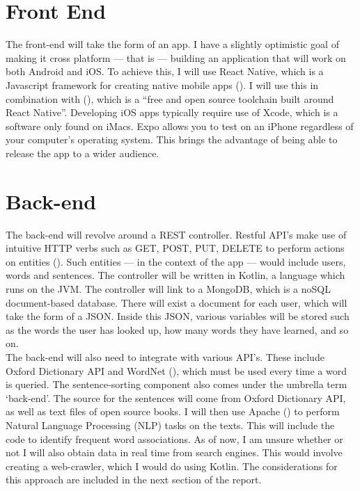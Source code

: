 \section{Front End}
The front-end will take the form of an app. I have a slightly optimistic goal of making it cross platform --- that is --- building an application that will work on both Android and iOS. To achieve this, I will use React Native, which is a Javascript framework for creating native mobile apps (\cite{reactNative}). I will use this in combination with (\cite{Expo}), which is a ``free and open source toolchain built around React Native''. Developing iOS apps typically require use of Xcode, which is a software only found on iMacs. Expo allows you to test on an iPhone regardless of your computer's operating system. This brings the advantage of being able to release the app to a wider audience.

\section{Back-end}

The back-end will revolve around a REST controller. Restful API's make use of intuitive HTTP verbs such as GET, POST, PUT, DELETE to perform actions on entities (\cite{richardson2008restful}). Such entities --- in the context of the app --- would include users, words and sentences. The controller will be written in Kotlin, a language which runs on the JVM. The controller will link to a MongoDB, which is a noSQL document-based database. There will exist a document for each user, which will take the form of a JSON. Inside this JSON, various variables will be stored such as the words the user has looked up, how many words they have learned, and so on.\\

The back-end will also need to integrate with various API's. These include Oxford Dictionary API and WordNet\textsuperscript{\textregistered} (\cite{miller1995wordnet}), which must be used every time a word is queried. The sentence-sorting component also comes under the umbrella term `back-end'. The source for the sentences will come from Oxford Dictionary API, as well as text files of open source books. I will then use  Apache (\cite{apache}) to perform Natural Language Processing (NLP) tasks on the texts. This will include the code to identify frequent word associations. As of now, I am unsure whether or not I will also obtain data in real time from search engines. This would involve creating a web-crawler, which I would do using Kotlin. The considerations for this approach are included in the next section of the report.




